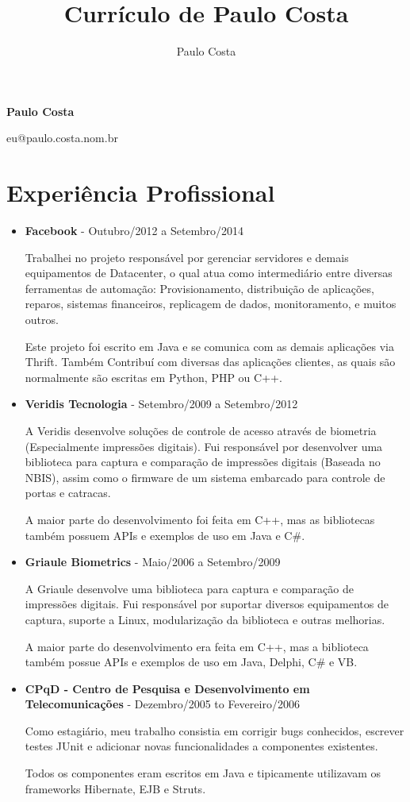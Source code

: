 \documentclass[a4paper,10pt]{article}
\title{Currículo de Paulo Costa}
\author{Paulo Costa}
\begin{document}
  
  \LARGE\textbf{Paulo Costa}

  \large eu@paulo.costa.nom.br



  \normalsize 

  \section{Experiência Profissional}
    \begin{itemize}
      \item
        \textbf{Facebook} - Outubro/2012 a Setembro/2014
        
        Trabalhei no projeto responsável por gerenciar servidores e demais equipamentos de Datacenter, o qual atua como intermediário entre diversas ferramentas de automação: Provisionamento, distribuição de aplicações, reparos, sistemas financeiros, replicagem de dados, monitoramento, e muitos outros.
        
        Este projeto foi escrito em Java e se comunica com as demais aplicações via Thrift. Também Contribuí com diversas das aplicações clientes, as quais são normalmente são escritas em Python, PHP ou C++.

      \item
        \textbf{Veridis Tecnologia} - Setembro/2009 a Setembro/2012

        A Veridis desenvolve soluções de controle de acesso através de biometria (Especialmente impressões digitais). Fui responsável por desenvolver uma biblioteca para captura e comparação de impressões digitais (Baseada no NBIS), assim como o firmware de um sistema embarcado para controle de portas e catracas.
        
        A maior parte do desenvolvimento foi feita em C++, mas as bibliotecas também possuem APIs e exemplos de uso em Java e C\#.

      \item
        \textbf{Griaule Biometrics} - Maio/2006 a Setembro/2009
        
        A Griaule desenvolve uma biblioteca para captura e comparação de impressões digitais. Fui responsável por suportar diversos equipamentos de captura, suporte a Linux, modularização da biblioteca e outras melhorias.
        
        A maior parte do desenvolvimento era feita em C++, mas a biblioteca também possue APIs e exemplos de uso em Java, Delphi, C\# e VB.

      \item
        \textbf{CPqD - Centro de Pesquisa e Desenvolvimento em Telecomunicações} - Dezembro/2005 to Fevereiro/2006

        Como estagiário, meu trabalho consistia em corrigir bugs conhecidos, escrever testes JUnit e adicionar novas funcionalidades a componentes existentes.

        Todos os componentes eram escritos em Java e tipicamente utilizavam os frameworks Hibernate, EJB e Struts.
    \end{itemize}
\end{document}
